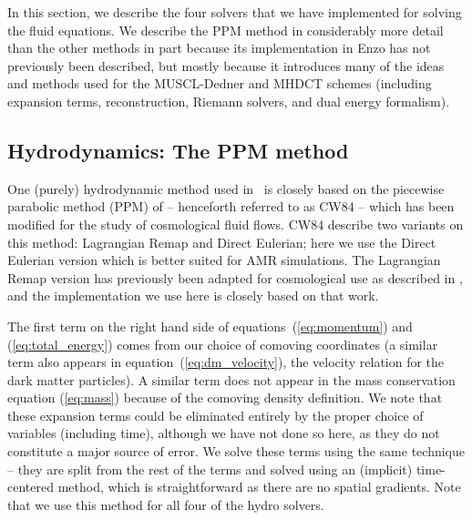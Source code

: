 In this section, we describe the four solvers that we have implemented for
solving the fluid equations.  We describe the PPM method in considerably
more detail than the other methods in part
because its implementation in Enzo has not previously been described,
but mostly because it introduces many of the ideas and methods used for
the MUSCL-Dedner and MHDCT schemes (including expansion terms,
reconstruction, Riemann solvers, and dual energy formalism).

\subsection{Hydrodynamics: The PPM method}
\label{sec.hydro.ppm}

One (purely) hydrodynamic method used in \enzo\ is closely based on the
piecewise parabolic method (PPM) of
\citet{1984JCoPh..54..174C} -- henceforth referred to as CW84 -- which has been
modified for the study of cosmological fluid flows.  
CW84 describe two variants on this method:
Lagrangian Remap and Direct Eulerian; here we use the Direct Eulerian
version which is better suited for AMR simulations.  The Lagrangian
Remap version has previously been adapted for cosmological use
as described in \citet{1995CoPhC..89..149B}, and the implementation
we use here is closely based on that work.

The first term on the right hand side of equations~(\ref{eq:momentum}) and
(\ref{eq:total_energy}) comes from our choice of comoving coordinates
(a similar term also appears in equation~(\ref{eq:dm_velocity}), the velocity 
relation for the dark matter particles).  A similar term does not
appear in the mass conservation equation (\ref{eq:mass}) because
of the comoving density definition.   
We note that these expansion terms could be
eliminated entirely by the proper choice of variables (including time),
although we have not done so here, as they do not constitute a major
source of error.  We solve these terms
using the same technique -- they are split from the rest of the terms and
solved using an (implicit) time-centered method, which is straightforward
as there are no spatial gradients.  Note that we use this method for
all four of the hydro solvers.

